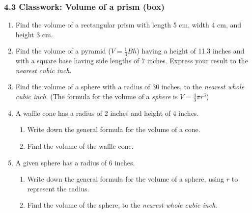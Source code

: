 

\fancyhead[LE]{\thepage}



\subsubsection*{4.3 Classwork: Volume of a prism (box)}
\begin{enumerate}
\item Find the volume of a rectangular prism with length 5 cm, width 4 cm, and height 3 cm. \vspace{1cm}

\item Find the volume of a pyramid ($V=\frac{1}{3}Bh$) having a height of 11.3 inches and with a square base having side lengths of 7 inches. Express your result to the \emph{nearest cubic inch}. \vspace{3cm}


\item Find the volume of a sphere with a radius of 30 inches, to the \emph{nearest whole cubic inch}. (The formula for the volume of a \emph{sphere} is $V=\frac{4}{3}\pi r^3$) \vspace{3cm}

\item A waffle cone has a radius of 2 inches and height of 4 inches. 
\begin{enumerate}
  \item Write down the general formula for the volume of a cone. \vspace{1cm}
  \item Find the volume of the waffle cone.
\end{enumerate}  \vspace{3cm}

\item A given sphere has a radius of 6 inches.
\begin{enumerate}
  \item Write down the general formula for the volume of a sphere, using $r$ to represent the radius. \vspace{1cm}
  \item Find the volume of the sphere, to the \emph{nearest whole cubic inch}.
\end{enumerate}  \vspace{3cm}


\end{enumerate}
